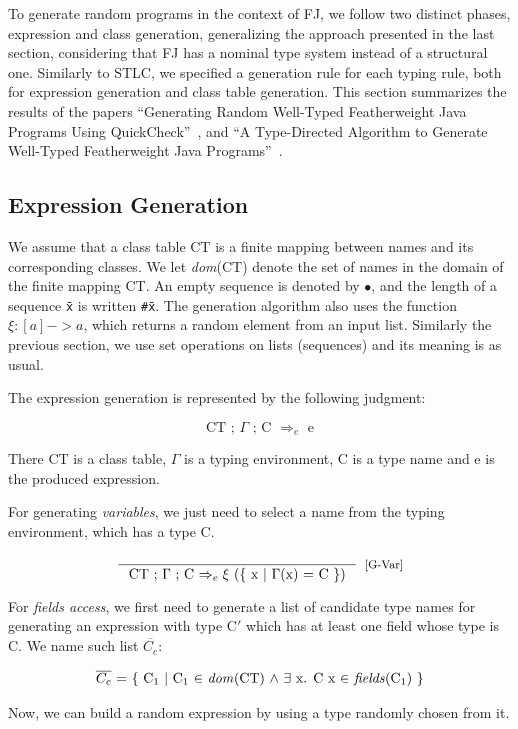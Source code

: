 \documentclass[tese,capa,english]{texufpel}
\begin{document}
To generate random programs in the context of FJ, we follow two distinct phases, expression and class generation, generalizing the approach presented in the last section, considering that FJ has a nominal type system instead of a structural one. Similarly to STLC, we specified a generation rule for each typing rule, both for expression generation and class table generation. This section summarizes the results of the papers ``Generating Random Well-Typed Featherweight Java Programs Using QuickCheck''~\cite{feitosa2018-2}, and ``A Type-Directed Algorithm to Generate Well-Typed Featherweight Java Programs''~\cite{feitosa2018-4}.

\subsection{Expression Generation}

We assume that a class table CT is a finite mapping between names and its corresponding classes. We let \emph{dom}(CT) denote the set of names in the domain of the finite mapping CT. An empty sequence is denoted by $\bullet$, and the length of a sequence \texttt{\={x}} is written \texttt{\#\={x}}. The generation algorithm also uses the function $\xi : [a] -> a$, which returns a random element from an input list. Similarly the previous section, we use set operations on lists (sequences) and its meaning is as usual.

The expression generation is represented by the following judgment:

\[
\textrm{CT ; $\Gamma$ ; C $\Rightarrow_e$ e}
\]

There CT is a class table, $\Gamma$ is a typing environment, C is a type name and e is the produced expression.

For generating \emph{variables}, we just need to select a name from the typing environment, which has a type C.

\[
\inference{}
          {\textrm{CT ; $\Gamma$ ; C $\Rightarrow_e \xi$ (\{ x $\mid$ $\Gamma$(x) = C \})}}[\footnotesize{[G-Var]}]
\]

For \emph{fields access}, we first need to generate a list of candidate type names for generating an expression with type C$'$ which has at least one field whose type is C. We name such list $\overline{C_c}$:

\[
\textrm{$\overline{C_c}$ = \{ C$_1$ $\mid$ C$_1$ $\in$ \emph{dom}(CT) $\land$ $\exists$ x. C x $\in$ \emph{fields}(C$_1$) \}}
\]

Now, we can build a random expression by using a type randomly chosen from it.
\end{document}
